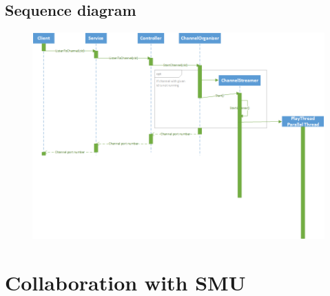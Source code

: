 \documentclass[a4paper,11pt,report]{article}
\begin{document}
\begin{landscape}
\subsection{Sequence diagram}
\begin{figure}[H]
\includegraphics[]{./ListenToChannelSD.png}
\end{figure}
\end{landscape}


\section{Collaboration with SMU}
\end{document}
